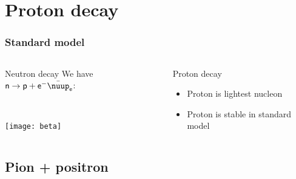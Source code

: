 \documentclass[english, fleqn]{beamer}
\begin{document}
\begin{frame}
    \parencite{Wu/Proton-decay}

\end{frame}

\section{Proton decay}

\begin{frame}
    \frametitle{Standard model}

    \begin{columns}[t]
        \begin{column}{.5\linewidth}
            \begin{block}{Neutron decay}
                We have $\mathsf n \to \mathsf p + \mathsf e^- \bar\nuup_{\mathsf e}$:

                \

                \texttt{[image: beta]}
            \end{block}
        \end{column}
        \pause
        \begin{column}{.5\linewidth}
            \begin{block}{Proton decay}
                \begin{itemize}
                    \item Proton is lightest nucleon
                    \item \alert{Proton is stable in standard model}
                \end{itemize}
            \end{block}
        \end{column}
    \end{columns}
\end{frame}

\subsection{Pion + positron}
\end{document}
